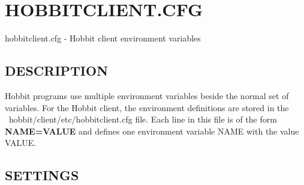  
%
\newpage
\section{HOBBITCLIENT.CFG}

 hobbitclient.cfg - Hobbit client environment variables 

 

\subsection{DESCRIPTION}
 Hobbit programs use multiple environment variables beside the normal
 set of variables. For the Hobbit client, the environment definitions
 are stored in the ~hobbit/client/etc/hobbitclient.cfg file. Each line
 in this file is of the form \textbf{NAME=VALUE} and defines one
 environment variable NAME with the value VALUE. 


 
\subsection{SETTINGS}

